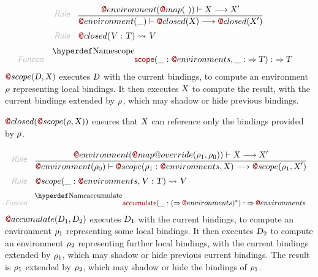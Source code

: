 \begin{align*}
  \KEY{Rule} \quad
    & \RULE{
      \FUN@environment (  \FUN@map
                      (   \  ) ) \vdash \VAR{X} \TRANS 
        \VAR{X}'
      }{
      \FUN@environment (  \_ ) \vdash \FUN@closed
                    (  \VAR{X} ) \TRANS 
        \FUN@closed
          (  \VAR{X}' )
      }
\\
  \KEY{Rule} \quad
    & \FUN@closed
        (  \VAR{V} : \VAR{T} ) \leadsto 
        \VAR{V}
\end{align*}
\begin{align*}
  \KEY{Funcon} \quad
  & \FUNDEC{scope}(
                     \_ : \FUN@environments, \_ :  \TO \VAR{T}) 
    :  \TO \VAR{T} 
\end{align*}
$\FUN@scope
    (  \VAR{D}, 
           \VAR{X} )$ executes $\VAR{D}$ with the current bindings, to compute an environment
  $\VAR{\ensuremath{\rho}}$ representing local bindings. It then executes $\VAR{X}$ to compute the result,
  with the current bindings extended by $\VAR{\ensuremath{\rho}}$, which may shadow or hide previous
  bindings.

$\FUN@closed
    (  \FUN@scope
            (  \VAR{\ensuremath{\rho}}, 
                   \VAR{X} ) )$ ensures that $\VAR{X}$ can reference only the bindings
  provided by $\VAR{\ensuremath{\rho}}$.

\begin{align*}
  \KEY{Rule} \quad
    & \RULE{
      \FUN@environment (  \FUN@map@override
                      (  \VAR{\ensuremath{\rho}}\SUB{1}, 
                             \VAR{\ensuremath{\rho}}\SUB{0} ) ) \vdash \VAR{X} \TRANS 
        \VAR{X}'
      }{
      \FUN@environment (  \VAR{\ensuremath{\rho}}\SUB{0} ) \vdash \FUN@scope
                    (  \VAR{\ensuremath{\rho}}\SUB{1} : \FUN@environments, 
                           \VAR{X} ) \TRANS 
        \FUN@scope
          (  \VAR{\ensuremath{\rho}}\SUB{1}, 
                 \VAR{X}' )
      }
\\
  \KEY{Rule} \quad
    & \FUN@scope
        (  \_ : \FUN@environments, 
               \VAR{V} : \VAR{T} ) \leadsto 
        \VAR{V}
\end{align*}
\begin{align*}
  \KEY{Funcon} \quad
  & \FUNDEC{accumulate}(
                     \_ : (   \TO \FUN@environments )\STAR) 
    :  \TO \FUN@environments 
\end{align*}
$\FUN@accumulate
    (  \VAR{D}\SUB{1}, 
           \VAR{D}\SUB{2} )$ executes $\VAR{D}\SUB{1}$ with the current bindings, to compute an
  environment $\VAR{\ensuremath{\rho}}\SUB{1}$ representing some local bindings. It then executes $\VAR{D}\SUB{2}$ to
  compute an environment $\VAR{\ensuremath{\rho}}\SUB{2}$ representing further local bindings, with the
  current bindings extended by $\VAR{\ensuremath{\rho}}\SUB{1}$, which may shadow or hide previous
  current bindings. The result is $\VAR{\ensuremath{\rho}}\SUB{1}$ extended by $\VAR{\ensuremath{\rho}}\SUB{2}$, which may shadow
  or hide the bindings of $\VAR{\ensuremath{\rho}}\SUB{1}$.

